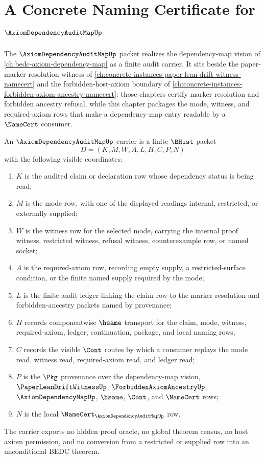 \chapter{A Concrete Naming Certificate for $\AxiomDependencyAuditMapUp$}
\label{ch:concrete-instances-axiom-dependency-audit-map-namecert}

The $\AxiomDependencyAuditMapUp$ packet realizes the dependency-map vision of \autoref{ch:bedc-axiom-dependency-map} as a finite audit carrier. It sits beside the paper-marker resolution witness of \autoref{ch:concrete-instances-paper-lean-drift-witness-namecert} and the forbidden-host-axiom boundary of \autoref{ch:concrete-instances-forbidden-axiom-ancestry-namecert}: those chapters certify marker resolution and forbidden ancestry refusal, while this chapter packages the mode, witness, and required-axiom rows that make a dependency-map entry readable by a $\NameCert$ consumer.

\begin{definition}
\label{def:axiom-dependency-audit-map-carrier}
An $\AxiomDependencyAuditMapUp$ carrier is a finite $\BHist$ packet
$$
D=(K,M,W,A,L,H,C,P,N)
$$
with the following visible coordinates:
\begin{enumerate}
\item $K$ is the audited claim or declaration row whose dependency status is being read;
\item $M$ is the mode row, with one of the displayed readings internal, restricted, or externally supplied;
\item $W$ is the witness row for the selected mode, carrying the internal proof witness, restricted witness, refusal witness, counterexample row, or named socket;
\item $A$ is the required-axiom row, recording empty supply, a restricted-surface condition, or the finite named supply required by the mode;
\item $L$ is the finite audit ledger linking the claim row to the marker-resolution and forbidden-ancestry packets named by provenance;
\item $H$ records componentwise $\hsame$ transport for the claim, mode, witness, required-axiom, ledger, continuation, package, and local naming rows;
\item $C$ records the visible $\Cont$ routes by which a consumer replays the mode read, witness read, required-axiom read, and ledger read;
\item $P$ is the $\Pkg$ provenance over the dependency-map vision, $\PaperLeanDriftWitnessUp$, $\ForbiddenAxiomAncestryUp$, $\AxiomDependencyMapUp$, $\hsame$, $\Cont$, and $\NameCert$ rows;
\item $N$ is the local $\NameCert_{\AxiomDependencyAuditMapUp}$ row.
\end{enumerate}
The carrier exports no hidden proof oracle, no global theorem census, no host axiom permission, and no conversion from a restricted or supplied row into an unconditional BEDC theorem.
\end{definition}

